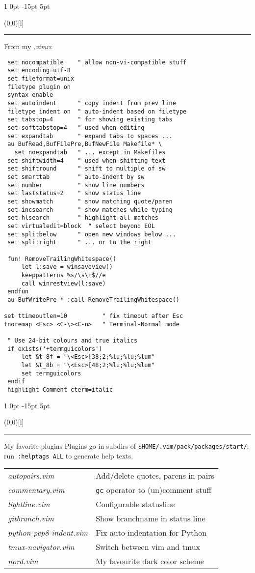\documentclass[a4paper, landscape, 10pt]{article}
\makeatletter
\newlength{\shift}
\renewcommand{\section}{%
    \@startsection{section}%
        {1}%
        {0pt}%
        {-15pt}%
        {5pt}%
        {\protect\makebox(0,0)[l]{\color{accentcolor!80}\rule[8pt]{\columnwidth}{19pt}}\hspace{.5em}\fontsize{14pt}{12pt}\selectfont\bfseries\color{white}}}
\newcommand{\V}[1]{\texttt{\textup{#1}}}
\makeatother
\begin{document}
\begin{multicols*}{3}
\section{From my \textit{.vimrc}}
\begin{verbatim}
 set nocompatible    " allow non-vi-compatible stuff
 set encoding=utf-8
 set fileformat=unix
 filetype plugin on
 syntax enable
 set autoindent      " copy indent from prev line
 filetype indent on  " auto-indent based on filetype
 set tabstop=4       " for showing existing tabs
 set softtabstop=4   " used when editing
 set expandtab       " expand tabs to spaces ...
 au BufRead,BufFilePre,BufNewFile Makefile* \
   set noexpandtab   " ... except in Makefiles
 set shiftwidth=4    " used when shifting text
 set shiftround      " shift to multiple of sw
 set smarttab        " auto-indent by sw
 set number          " show line numbers
 set laststatus=2    " show status line
 set showmatch       " show matching quote/paren
 set incsearch       " show matches while typing
 set hlsearch        " highlight all matches
 set virtualedit=block  " select beyond EOL
 set splitbelow      " open new windows below ...
 set splitright      " ... or to the right

 fun! RemoveTrailingWhitespace()
     let l:save = winsaveview()
     keeppatterns %s/\s\+$//e
     call winrestview(l:save)
 endfun
 au BufWritePre * :call RemoveTrailingWhitespace()

set ttimeoutlen=10          " fix timeout after Esc
tnoremap <Esc> <C-\><C-n>   " Terminal-Normal mode

 " Use 24-bit colours and true italics
 if exists('+termguicolors')
     let &t_8f = "\<Esc>[38;2;%lu;%lu;%lum"
     let &t_8b = "\<Esc>[48;2;%lu;%lu;%lum"
     set termguicolors
 endif
 highlight Comment cterm=italic
\end{verbatim}

\columnbreak



\section{My favorite plugins}
Plugins go in subdirs of \verb|$HOME/.vim/pack/packages/start/|; run~\V{:helptags ALL} to generate help texts.
\vspace{.5\baselineskip}

    \begin{tabularx}{\columnwidth}{>{\itshape}l>{\raggedright\arraybackslash}X}
autopairs.vim           &Add/delete quotes, parens in pairs\\
commentary.vim          &\V{gc} operator to (un)comment stuff\\
lightline.vim           &Configurable statusline\\
gitbranch.vim           &Show branchname in status line\\
python-pep8-indent.vim  &Fix auto-indentation for Python\\
tmux-navigator.vim      &Switch between vim and tmux\\
nord.vim                &My favourite dark color scheme
    \end{tabularx}


\end{multicols*}
\end{document}
